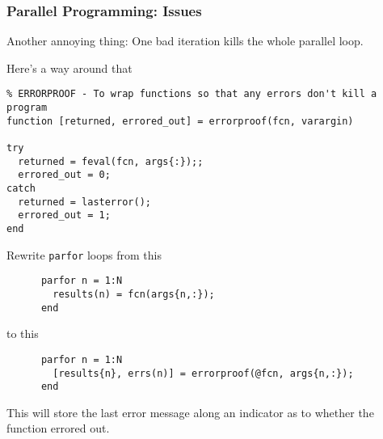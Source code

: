 \documentclass{beamer}
\begin{document}
  \begin{frame}[fragile, shrink=20]
    \frametitle{Parallel Programming: Issues}

    Another annoying thing: One bad iteration kills the whole parallel
    loop.\pause

    \vspace{10pt}
    Here's a way around that
    \begin{lstlisting}
% ERRORPROOF - To wrap functions so that any errors don't kill a program
function [returned, errored_out] = errorproof(fcn, varargin)

try
  returned = feval(fcn, args{:});;
  errored_out = 0;
catch
  returned = lasterror();
  errored_out = 1;
end
    \end{lstlisting}
    Rewrite \texttt{parfor} loops from this
    \begin{lstlisting}
      parfor n = 1:N
        results(n) = fcn(args{n,:});
      end
    \end{lstlisting}
    to this
    \begin{lstlisting}
      parfor n = 1:N
        [results{n}, errs(n)] = errorproof(@fcn, args{n,:});
      end
    \end{lstlisting}
    This will store the last error message along an indicator as to
    whether the function errored out.

	\end{frame}







\end{document}
